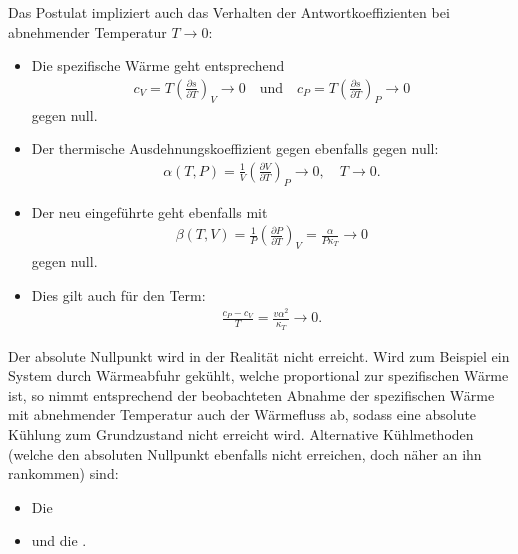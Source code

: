 \begin{summary}
    Das Postulat impliziert auch das Verhalten der Antwortkoeffizienten bei abnehmender Temperatur $T\rightarrow 0$: 
    \begin{itemize}
        \item Die spezifische Wärme geht entsprechend 
        \begin{align*}
            c_V=T\left(\frac{\partial s}{\partial T}\right)_V\rightarrow 0 \quad\mathrm{und}\quad c_P=T\left(\frac{\partial s}{\partial T}\right)_P\rightarrow 0 
        \end{align*}
        gegen null.
        \item Der thermische Ausdehnungskoeffizient gegen ebenfalls gegen null:
        \begin{align*}
            \alpha(T,P)=\frac{1}{V}\left(\frac{\partial V}{\partial T}\right)_P\rightarrow 0, \quad T\rightarrow 0.
        \end{align*}
        \item Der neu eingeführte  geht ebenfalls mit
        \begin{align*}
          \beta(T,V)=\frac{1}{P}\left(\frac{\partial P}{\partial T}\right)_V=\frac{\alpha}{P\kappa_T}\rightarrow 0  
        \end{align*}
        gegen null.
        \item Dies gilt auch für den Term:
        \begin{align*}
            \frac{c_P-c_V}{T}=\frac{v\alpha^2}{\kappa_T}\rightarrow 0.
        \end{align*}
    \end{itemize}
    Der absolute Nullpunkt wird in der Realität nicht erreicht. Wird zum Beispiel ein System durch Wärmeabfuhr gekühlt, welche proportional zur spezifischen Wärme ist, so nimmt entsprechend der beobachteten Abnahme der spezifischen Wärme mit abnehmender Temperatur auch der Wärmefluss ab, sodass eine absolute Kühlung zum Grundzustand nicht erreicht wird. Alternative Kühlmethoden (welche den absoluten Nullpunkt ebenfalls nicht erreichen, doch näher an ihn rankommen) sind:
    \begin{itemize}
        \item Die 
        \item und die .
    \end{itemize}
\end{summary}